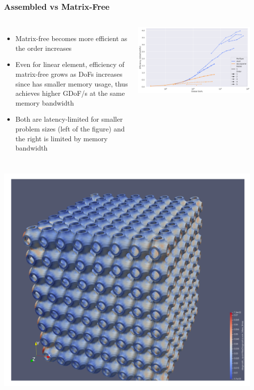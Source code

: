 \documentclass[aspectratio=169,xcolor=dvipsnames]{beamer}
\begin{document}
\begin{frame}
	\frametitle{Assembled vs Matrix-Free}
    \begin{columns}
        {\footnotesize
        \begin{itemize}
            \item Matrix-free becomes more efficient as the order increases
            \item Even for linear element, efficiency of matrix-free grows as DoFs increases since has smaller memory usage, thus achieves higher GDoF/s at the same memory bandwidth
            \item Both are latency-limited for smaller problem sizes (left of the figure) and the right is limited by memory bandwidth
        \end{itemize}
        }
        \centering
           \includegraphics[height =0.6\textheight]{figures/assemble-vs-matrixfree.png}
    \end{columns}
    \vspace*{-5pt}
    \centering
    \includegraphics[height =0.25\textheight, width =0.2\linewidth]{figures/schwarz-mesh.png}

\end{frame}

\end{document}
